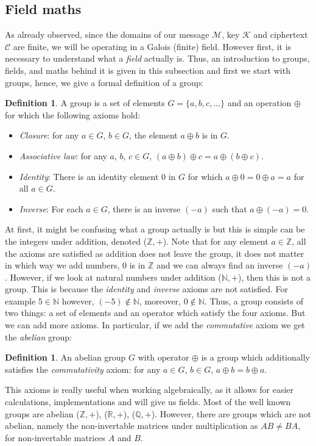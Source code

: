 \documentclass{Resources/UoBLab1}
\theoremstyle{definition}
\newtheorem{definition}[theorem]{Definition}
\begin{document}
\subsection{Field maths}
As already observed, since the domains of our message $\mathcal{M}$, key $\mathcal{K}$ and ciphertext $\mathcal{C}$ are finite, we will be operating in a Galois (finite) field. However first, it is necessary to understand what a \textit{field} actually is. Thus, an introduction to groups, fields, and maths behind it is given in this subsection and first we start with groups, hence, we give a formal definition of a group:
\begin{definition}
    A group is a set of elements $G = \{a, b, c, ...\}$ and an operation $\oplus$ for which the following axioms hold:
    \begin{itemize}
        \item \textit{Closure}: for any $a \in G$, $b \in G$, the element $a \oplus b$ is in $G$.
        \item \textit{Associative law}: for any $a$, $b$, $c \in G$, $(a \oplus b) \oplus c = a \oplus (b \oplus c)$.
        \item \textit{Identity}: There is an identity element $0$ in $G$ for which $a \oplus 0 = 0 \oplus a = a$ for all $a \in G$.
        \item \textit{Inverse}: For each $a \in G$, there is an inverse $(-a)$ such that $a \oplus (-a) = 0$.
    \end{itemize}
\end{definition}
At first, it might be confusing what a group actually is but this is simple can be the integers under addition, denoted ($\mathbb{Z}, +$). Note that for any element $a \in \mathbb{Z}$, all the axioms are satisfied as addition does not leave the group, it does not matter in which way we add numbers, $0$ is in $\mathbb{Z}$ and we can always find an inverse $(-a)$. However, if we look at natural numbers under addition ($\mathbb{N}, +$), then this is not a group. This is because the \textit{identity} and \textit{inverse} axioms are not satisfied. For example $5 \in \mathbb{N}$ however, $(-5) \notin \mathbb{N}$, moreover, $0 \notin \mathbb{N}$. Thus, a group consists of two things: a set of elements and an operator which satisfy the four axioms. But we can add more axioms. In particular, if we add the \textit{commutative} axiom we get the \textit{abelian} group:
\begin{definition}
    An abelian group $G$ with operator $\oplus$ is a group which additionally satisfies the \textit{commutativity} axiom: for any $a \in G$, $b \in G$, $a \oplus b = b \oplus a$.
\end{definition}
This axioms is really useful when working algebraically, as it allows for easier calculations, implementations and will give us fields. Most of the well known groups are abelian ($\mathbb{Z}, +$), ($\mathbb{R}, +$), ($\mathbb{Q}, +$). However, there are groups which are not abelian, namely the non-invertable matrices under multiplication as $AB \ne BA$, for non-invertable matrices $A$ and $B$.
\end{document}
